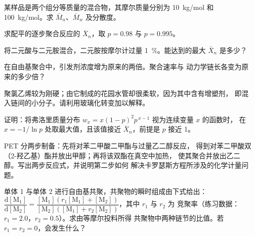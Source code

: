 \begin{exercise}[$\star\star$]\label{exo:b2:polymer-synthesis:5}
某样品是两个组分等质量的混合物，其摩尔质量分别为 \qty{10}{kg/mol} 和
\qty{100}{kg/mol}。求 $\bar M_n$、$\bar M_w$ 及分散度。
\end{exercise}

\begin{exercise}[$\star\star$]\label{exo:b2:polymer-synthesis:6}
求配平的逐步聚合反应的 $\bar X_n$，取 $p = 0.98$ 与 $p = 0.995$。
\end{exercise}

\begin{exercise}[$\star\star$]\label{exo:b2:polymer-synthesis:7}
将二元酸与二元胺混合，二元胺按摩尔计过量 1~\%。能达到的最大
$\bar X_n$ 是多少？
\end{exercise}

\begin{exercise}[$\star\star$]\label{exo:b2:polymer-synthesis:8}
在自由基聚合中，引发剂浓度增为原来的两倍。聚合速率与
动力学链长各变为原来的多少倍？
\end{exercise}

\begin{exercise}[$\star\star$]\label{exo:b2:polymer-synthesis:9}
聚氯乙烯较为刚硬；由它制成的花园水管却很柔软，因为其中含有增塑剂，
即混入链间的小分子。请利用玻璃化转变加以解释。
\end{exercise}

\begin{exercise}[$\star\star\star$]\label{exo:b2:polymer-synthesis:10}
证明：将弗洛里质量分布 $w_x = x(1-p)^2p^{\,x-1}$ 视为连续变量 $x$ 的函数时，
在 $x = -1/\ln p$ 处取最大值，且该值接近 $\bar X_n$，前提是 $p$ 接近 1。
\end{exercise}

\begin{exercise}[$\star\star\star$]\label{exo:b2:polymer-synthesis:11}
PET 分两步制备：先将对苯二甲酸二甲酯与过量乙二醇反应，
得到对苯二甲酸双（2-羟乙基）酯并放出甲醇；再将该双酯在真空中加热，
使其聚合并放出乙二醇。写出两步反应式，并说明第二步如何
解决卡罗瑟斯方程所涉及的化学计量问题。
\end{exercise}

\begin{exercise}[$\star\star\star$]\label{exo:b2:polymer-synthesis:12}
单体 1 与单体 2 进行自由基共聚，共聚物的瞬时组成由下式给出：
$\dfrac{\mathrm d[\mathrm M_1]}{\mathrm d[\mathrm M_2]} = \dfrac{[\mathrm M_1](r_1[\mathrm M_1]
+ [\mathrm M_2])}{[\mathrm M_2]([\mathrm M_1] + r_2[\mathrm M_2])}$，其中 $r_1$ 与 $r_2$ 为
竞聚率（练习数据：$r_1 = 2.0$，$r_2 = 0.5$）。求由等摩尔投料所得
共聚物中两种链节的比值。若 $r_1 = r_2 = 0$，会发生什么？
\end{exercise}

